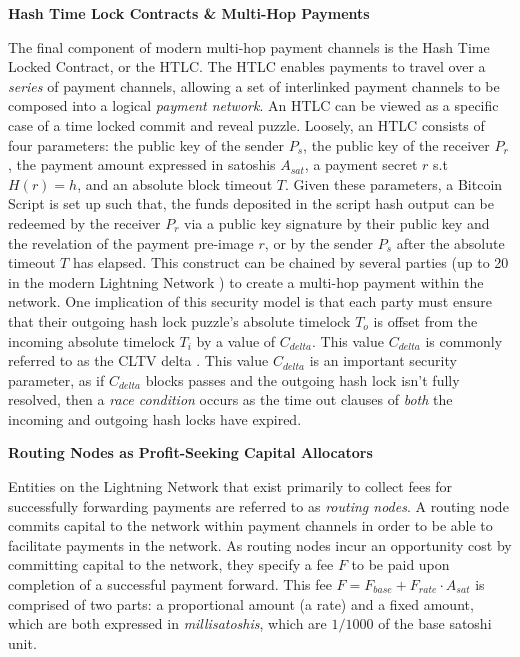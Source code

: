 \documentclass[10pt,a4paper]{article}
\theoremstyle{definition}
\begin{document}
\begin{center}
\textbf{Hash Time Lock Contracts \& Multi-Hop Payments}
\end{center}

The final component of modern multi-hop payment channels is the Hash Time
Locked Contract, or the HTLC. The HTLC enables payments to travel over a
\emph{series} of payment channels, allowing a set of interlinked payment
channels to be composed into a logical \emph{payment network}. An HTLC can be
viewed as a specific case of a time locked commit and reveal puzzle.  Loosely,
an HTLC consists of four parameters: the public key of the sender $P_{s}$, the
public key of the receiver $P_{r}$, the payment amount expressed in satoshis
$A_{sat}$, a payment secret $r$ s.t $H(r) = h$, and an absolute block timeout
$T$. Given these parameters, a Bitcoin Script is set up such that, the funds
deposited in the script hash output can be redeemed by the receiver $P_{r}$ via
a public key signature by their public key and the revelation of the payment
pre-image $r$, or by the sender $P_{s}$ after the absolute timeout $T$ has
elapsed. This construct can be chained by several parties (up to 20 in the
modern Lightning Network \cite{bolt4}) to create a multi-hop payment within the
network. One implication of this security model is that each party must ensure
that their outgoing hash lock puzzle's absolute timelock $T_o$ is offset from
the incoming absolute timelock $T_i$ by a value of $C_{delta}$. This value
$C_{delta}$ is commonly referred to as the CLTV delta \cite{bolt7}. This value
$C_{delta}$ is an important security parameter, as if $C_{delta}$ blocks passes
and the outgoing hash lock isn't fully resolved, then a \emph{race condition}
occurs as the time out clauses of \emph{both} the incoming and outgoing hash
locks have expired. \\

\begin{center}
\textbf{Routing Nodes as Profit-Seeking Capital Allocators}
\end{center}

Entities on the Lightning Network that exist primarily to collect fees for
successfully forwarding payments are referred to as \emph{routing nodes}. A
routing node commits capital to the network within payment channels in order to
be able to facilitate payments in the network.  As routing nodes incur an
opportunity cost by committing capital to the network, they specify a fee $F$
to be paid upon completion of a successful payment forward. This fee $F =
F_{base} + F_{rate} \cdot A_{sat}$ is comprised of two parts: a proportional
amount (a rate) and a fixed amount, which are both expressed in
\emph{millisatoshis}, which are $1/1000$ of the base satoshi unit.
\end{document}
